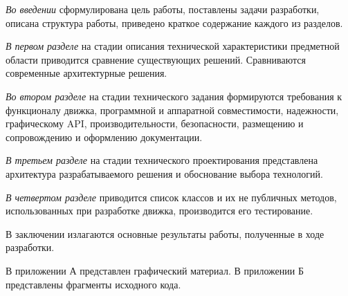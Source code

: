 \emph{Во введении} сформулирована цель работы, поставлены задачи разработки, описана структура работы, приведено краткое содержание каждого из разделов.

\emph{В первом разделе} на стадии описания технической характеристики предметной области приводится сравнение существующих решений. Сравниваются современные архитектурные решения. 

\emph{Во втором разделе} на стадии технического задания формируются требования к функционалу движка, программной и аппаратной совместимости, надежности, графическому API, производительности, безопасности, размещению и сопровождению и оформлению документации.

\emph{В третьем разделе} на стадии технического проектирования представлена архитектура разрабатываемого решения и обоснование выбора технологий.

\emph{В четвертом разделе} приводится список классов и их не публичных методов, использованных при разработке движка, производится его тестирование.

В заключении излагаются основные результаты работы, полученные в ходе разработки.

В приложении А представлен графический материал.
В приложении Б представлены фрагменты исходного кода. 
